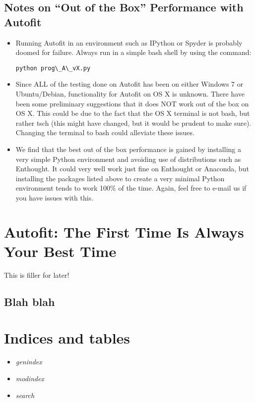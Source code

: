 \documentclass[letterpaper,10pt,english]{sphinxmanual}
\begin{document}
\section{Notes on ``Out of the Box'' Performance with Autofit}
\label{gettingstarted:notes-on-out-of-the-box-performance-with-autofit}\begin{itemize}
\item {} 
Running Autofit in an environment such as IPython or Spyder is probably doomed for failure. Always run in a simple bash shell by using the command:

\begin{Verbatim}[commandchars=\\\{\}]
python prog\_A\_vX.py
\end{Verbatim}

\item {} 
Since ALL of the testing done on Autofit has been on either Windows 7 or Ubuntu/Debian, functionality for Autofit on OS X is unknown. There have been some preliminary suggestions that it does NOT work out of the box on OS X. This could be due to the fact that the OS X terminal is not bash, but rather tsch (this might have changed, but it would be prudent to make sure). Changing the terminal to bash could alleviate these issues.

\item {} 
We find that the best out of the box performance is gained by installing a very simple Python environment and avoiding use of distributions such as Enthought. It could very well work just fine on Enthought or Anaconda, but installing the packages listed above to create a very minimal Python environment tends to work 100\% of the time. Again, feel free to e-mail us if you have issues with this.

\end{itemize}


\chapter{Autofit: The First Time Is Always Your Best Time}
\label{tutorial:autofit-the-first-time-is-always-your-best-time}\label{tutorial::doc}
This is filler for later!


\section{Blah blah}
\label{tutorial:blah-blah}

\chapter{Indices and tables}
\label{index:indices-and-tables}\begin{itemize}
\item {} 
\emph{genindex}

\item {} 
\emph{modindex}

\item {} 
\emph{search}

\end{itemize}



\renewcommand{\indexname}{Index}
\printindex
\end{document}
